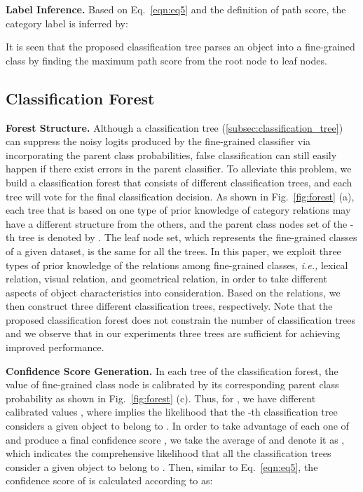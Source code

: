 \documentclass[sigconf]{acmart}
\newcommand{\myparagraph}[1]{{\vspace{0.5em} \noindent \bf #1}}
\begin{document}
\myparagraph{Label Inference.} 
Based on Eq.~\ref{eqn:eq5} and the definition of path score, the category label is inferred by:


It is seen that the proposed classification tree parses an object into a fine-grained class by finding the maximum path score from the root node to leaf nodes.

\subsection{Classification Forest}
\label{subsec:classification_forest}
\myparagraph{Forest Structure.} Although a classification tree (\cref{subsec:classification_tree}) can suppress the noisy logits produced by the fine-grained classifier via incorporating the parent class probabilities, false classification can still easily happen if there exist errors in the parent classifier. To alleviate this problem, we build a classification forest that consists of  different classification trees, and each tree will vote for the final classification decision.  As shown in Fig.~\ref{fig:forest} (a), each tree that is based on one type of prior knowledge of category relations may have a different structure from the others, and the parent class nodes set of the -th tree is denoted by . The leaf node set, which represents the fine-grained classes of a given dataset, is the same for all the trees. In this paper, we exploit three types of prior knowledge of the relations among fine-grained classes, \emph{i.e.,} lexical relation, visual relation, and geometrical relation, in order to take different aspects of object characteristics into consideration. Based on the relations, we then construct three different classification trees, respectively. Note that the proposed classification forest does not constrain the number of classification trees and we observe that in our experiments three trees are sufficient for achieving improved performance.

\myparagraph{Confidence Score Generation.} In each tree of the classification forest, the value of fine-grained class node  is calibrated by its corresponding parent class probability as shown in  Fig.~\ref{fig:forest} (c). Thus, for , we have  different calibrated values , where  implies the likelihood that the -th classification tree considers a given object to belong to . In order to take advantage of each one of  and produce a final confidence score , we take the average of  and denote it as , which indicates the comprehensive likelihood that all the classification trees consider a given object to belong to . Then, similar to Eq.~\ref{eqn:eq5}, the confidence score of  is calculated according to  as:
\end{document}
